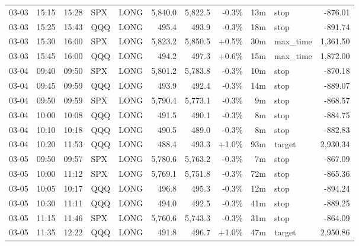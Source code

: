 \documentclass[11pt,a4paper,twoside]{article}
\begin{document}
\begin{center}
\begin{longtable}{>{\color{txtmain}}l l l l l r r r r >{\color{txtmain}}l r}
03-03 & 15:15 & 15:28 & SPX & LONG & 5,840.0 & 5,822.5 & \textcolor{lossred}{-0.3\%} & 13m & stop & \textcolor{lossred}{-876.01} \\
03-03 & 15:25 & 15:43 & QQQ & LONG & 495.4 & 493.9 & \textcolor{lossred}{-0.3\%} & 18m & stop & \textcolor{lossred}{-891.74} \\
03-03 & 15:30 & 16:00 & SPX & LONG & 5,823.2 & 5,850.5 & \textcolor{wingreen}{+0.5\%} & 30m & max\_time & \textcolor{wingreen}{1,361.50} \\
03-03 & 15:45 & 16:00 & QQQ & LONG & 494.2 & 497.3 & \textcolor{wingreen}{+0.6\%} & 15m & max\_time & \textcolor{wingreen}{1,872.00} \\
03-04 & 09:40 & 09:50 & SPX & LONG & 5,801.2 & 5,783.8 & \textcolor{lossred}{-0.3\%} & 10m & stop & \textcolor{lossred}{-870.18} \\
03-04 & 09:45 & 09:59 & QQQ & LONG & 493.9 & 492.4 & \textcolor{lossred}{-0.3\%} & 14m & stop & \textcolor{lossred}{-889.07} \\
03-04 & 09:50 & 09:59 & SPX & LONG & 5,790.4 & 5,773.1 & \textcolor{lossred}{-0.3\%} & 9m & stop & \textcolor{lossred}{-868.57} \\
03-04 & 10:00 & 10:08 & QQQ & LONG & 491.5 & 490.1 & \textcolor{lossred}{-0.3\%} & 8m & stop & \textcolor{lossred}{-884.75} \\
03-04 & 10:10 & 10:18 & QQQ & LONG & 490.5 & 489.0 & \textcolor{lossred}{-0.3\%} & 8m & stop & \textcolor{lossred}{-882.83} \\
03-04 & 10:20 & 11:53 & QQQ & LONG & 488.4 & 493.3 & \textcolor{wingreen}{+1.0\%} & 93m & target & \textcolor{wingreen}{2,930.34} \\
03-05 & 09:50 & 09:57 & SPX & LONG & 5,780.6 & 5,763.2 & \textcolor{lossred}{-0.3\%} & 7m & stop & \textcolor{lossred}{-867.09} \\
03-05 & 10:00 & 11:12 & SPX & LONG & 5,769.1 & 5,751.8 & \textcolor{lossred}{-0.3\%} & 72m & stop & \textcolor{lossred}{-865.36} \\
03-05 & 10:05 & 10:17 & QQQ & LONG & 496.8 & 495.3 & \textcolor{lossred}{-0.3\%} & 12m & stop & \textcolor{lossred}{-894.24} \\
03-05 & 10:30 & 11:11 & QQQ & LONG & 494.0 & 492.5 & \textcolor{lossred}{-0.3\%} & 41m & stop & \textcolor{lossred}{-889.25} \\
03-05 & 11:15 & 11:46 & SPX & LONG & 5,760.6 & 5,743.3 & \textcolor{lossred}{-0.3\%} & 31m & stop & \textcolor{lossred}{-864.09} \\
03-05 & 11:35 & 12:22 & QQQ & LONG & 491.8 & 496.7 & \textcolor{wingreen}{+1.0\%} & 47m & target & \textcolor{wingreen}{2,950.86} \\

\end{longtable}
\end{center}
\end{document}
